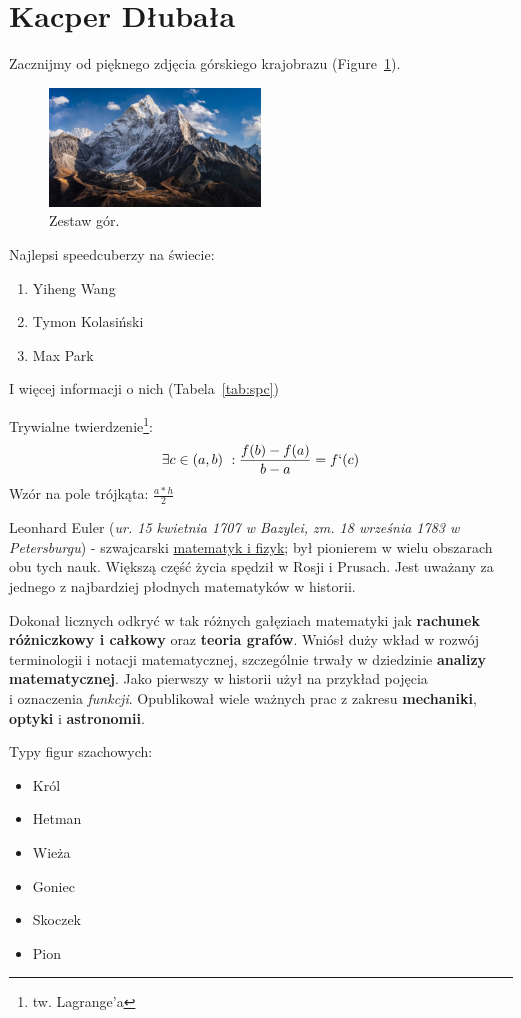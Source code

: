 \section{Kacper Dłubała}
\label{sec:kdlub}

Zacznijmy od pięknego zdjęcia górskiego krajobrazu (Figure~\ref{fig:mnt}).

\begin{figure}[htbp]
    \centering
    \includegraphics[width=0.5\textwidth]{pictures/gory.jpg}
    \caption{Zestaw gór.}
    \label{fig:mnt}
\end{figure}

Najlepsi speedcuberzy na świecie:
\begin{enumerate}
    \item Yiheng Wang
    \item Tymon Kolasiński
    \item Max Park
\end{enumerate}

I więcej informacji o nich (Tabela~\ref{tab:spc}) 



Trywialne twierdzenie\footnote{tw. Lagrange'a}: \[\exists c\in(a, b)\ : \frac{f(b)-f(a)}{b-a}=f`(c)\]
Wzór na pole trójkąta: $\frac{a*h}{2}$

\vspace{1cm}

Leonhard Euler (\textit{ur. 15 kwietnia 1707 w Bazylei, zm. 18 września 1783 w Petersburgu}) - szwajcarski \underline{matematyk i fizyk}; był pionierem w wielu obszarach obu tych nauk. Większą część życia spędził w Rosji i Prusach. Jest uważany za jednego z najbardziej płodnych matematyków w historii.

Dokonał licznych odkryć w tak różnych gałęziach matematyki jak \textbf{rachunek różniczkowy i całkowy} oraz \textbf{teoria grafów}. Wniósł duży wkład w rozwój terminologii i notacji matematycznej, szczególnie trwały w dziedzinie \textbf{analizy matematycznej}. Jako pierwszy w historii użył na przykład pojęcia \\i oznaczenia \emph{funkcji}. Opublikował wiele ważnych prac z zakresu \textbf{mechaniki}, \textbf{optyki} i \textbf{astronomii}.

\vspace{1cm}

Typy figur szachowych:
\begin{itemize}
    \item Król
    \item Hetman
    \item Wieża
    \item Goniec
    \item Skoczek
    \item Pion
\end{itemize}



